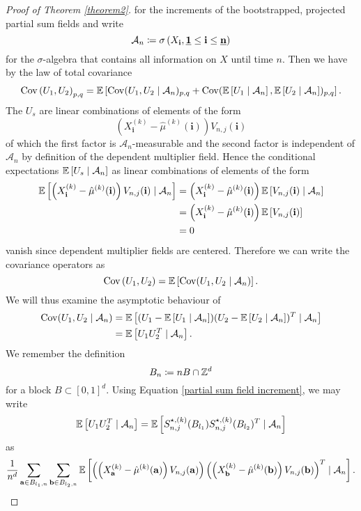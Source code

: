 \begin{proof}[Proof of Theorem \ref{theorem2}]
    for the increments of the bootstrapped, projected partial sum fields and write
    \[ \mathcal{A}_n \coloneqq \sigma\left(X_{\mathbf{i}}, \usbf[1] \leq \mathbf{i} \leq \usbf[n] \right) \]
    for the $\sigma$-algebra that contains all information on $X$ until time $n$.
    Then we have by the law of total covariance
    \begin{align*}
        \mathrm{Cov}\left( U_1, U_2 \right)_{p, q} = \mathbb{E}\left[\mathrm{Cov}(U_1, U_2 \mid \mathcal{A}_n)_{p, q} + \mathrm{Cov}(\mathbb{E}\left[U_1 \mid \mathcal{A}_n\right], \mathbb{E}\left[U_2 \mid \mathcal{A}_n\right])_{p, q}\right].
    \end{align*}
    The $U_s$ are linear combinations of elements of the form
    \[ \left(X^{(k)}_{\mathbf{i}} - \hat{\mu}^{(k)}(\mathbf{i})\right) V_{n, j}(\mathbf{i}) \]
    of which the first factor is $\mathcal{A}_n$-measurable and the second factor is independent of $\mathcal{A}_n$ by definition of the dependent multiplier field. Hence the conditional expectations $\mathbb{E}\left[U_s \mid \mathcal{A}_n\right]$ as linear combinations of elements of the form
    \begin{align*}
        \mathbb{E}\left[\left(X^{(k)}_{\mathbf{i}} - \hat{\mu}^{(k)}(\mathbf{i})\right) V_{n, j}(\mathbf{i}) \mid \mathcal{A}_n\right] 
        & = \left(X^{(k)}_{\mathbf{i}} - \hat{\mu}^{(k)}(\mathbf{i})\right) \mathbb{E}\left[ V_{n, j}(\mathbf{i}) \mid \mathcal{A}_n\right] \\
        & = \left(X^{(k)}_{\mathbf{i}} - \hat{\mu}^{(k)}(\mathbf{i})\right) \mathbb{E}\left[ V_{n, j}(\mathbf{i})\right] \\
        & = 0
    \end{align*}
    vanish since dependent multiplier fields are centered. Therefore we can write the covariance operators as
    \[ \mathrm{Cov}\left( U_1, U_2 \right) = \mathbb{E}\left[\mathrm{Cov}(U_1, U_2 \mid \mathcal{A}_n)\right]. \]
    We will thus examine the asymptotic behaviour of
    \begin{align*}
        \mathrm{Cov}(U_1, U_2 \mid \mathcal{A}_n) 
        & = \mathbb{E}\left[(U_1 - \mathbb{E}\left[U_1 \mid \mathcal{A}_n\right]) (U_2 - \mathbb{E}\left[U_2 \mid \mathcal{A}_n\right])^T \mid \mathcal{A}_n\right] \\
        & = \mathbb{E}\left[U_1 U_2 ^T \mid \mathcal{A}_n\right].
    \end{align*}
    We remember the definition
    \[ B_n \coloneqq n B \cap \mathbb{Z}^d \]
    for a block $B \subset [0,1]^d$. Using Equation \eqref{partial sum field increment}, we may write
    \[  \mathbb{E}\left[U_1 U_2 ^T \mid \mathcal{A}_n\right] = \mathbb{E}\left[S_{n, j}^{\star, (k)}(B_{l_1}) S_{n, j}^{\star, (k)}(B_{l_2})^T \mid \mathcal{A}_n\right] \]
    as
    \[ \frac{1}{n^d} \sum\limits_{\mathbf{a} \in B_{l_1, n}} \sum\limits_{\mathbf{b} \in B_{l_2, n}} \mathbb{E}\left[\left(  \left( X_\mathbf{a}^{(k)} - \hat{\mu}^{(k)}(\mathbf{a}) \right) V_{n, j}(\mathbf{a}) \right) \left(  \left( X_\mathbf{b}^{(k)} - \hat{\mu}^{(k)}(\mathbf{b}) \right) V_{n, j}(\mathbf{b}) \right)^T \mid \mathcal{A}_n\right]. \]

\end{proof}
